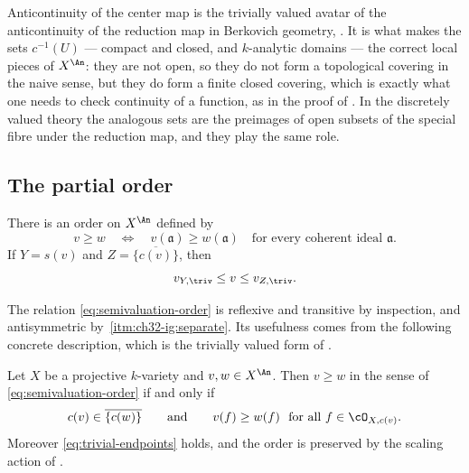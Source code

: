 \begin{remark}
\label{rem:ch32-anticontinuity}
Anticontinuity of the center map is the trivially valued avatar of the
anticontinuity of the reduction map in Berkovich geometry,
.  It is what makes the sets
$c^{-1}(U)$ --- compact and closed, and $k$-analytic domains --- the
correct local pieces of $X^{\An}$: they are not open, so they do not form
a topological covering in the naive sense, but they do form a finite closed
covering, which is exactly what one needs to check continuity of a function,
as in the proof of .  In the discretely
valued theory the analogous sets are the preimages of open subsets of the
special fibre under the reduction map, and they play the same role.
\end{remark}

\subsection{The partial order}
\label{sec:ch32-order}

There is an order on $X^{\An}$ defined by
\begin{equation}
\label{eq:semivaluation-order}
 v\geq w \quad\Longleftrightarrow\quad
 v(\mathfrak a)\geq w(\mathfrak a)
 \quad\text{for every coherent ideal }\mathfrak a.
\end{equation}
If $Y=s(v)$ and $Z=\overline{\{c(v)\}}$, then
\begin{equation}
\label{eq:trivial-endpoints}
                 v_{Y,\triv}\leq v\leq v_{Z,\triv}.
\end{equation}

The relation \eqref{eq:semivaluation-order} is reflexive and transitive by
inspection, and antisymmetric by
\,\cref{itm:ch32-ig:separate}.  Its
usefulness comes from the following concrete description, which is the
trivially valued form of \cite[Lemma~4.4]{JM12}.

\begin{theorem}
\label{thm:ch32-order-centers}
Let $X$ be a projective $k$-variety and $v,w\in X^{\An}$.  Then
$v\geq w$ in the sense of \eqref{eq:semivaluation-order} if and only if
\begin{equation}
\label{eq:ch32-order-criterion}
 c(v)\in\overline{\{c(w)\}}
 \qquad\text{and}\qquad
 v(f)\geq w(f)\ \text{ for all }f\in\cO_{X,c(v)} .
\end{equation}
Moreover \eqref{eq:trivial-endpoints} holds, and the order is preserved by
the scaling action of .
\end{theorem}


